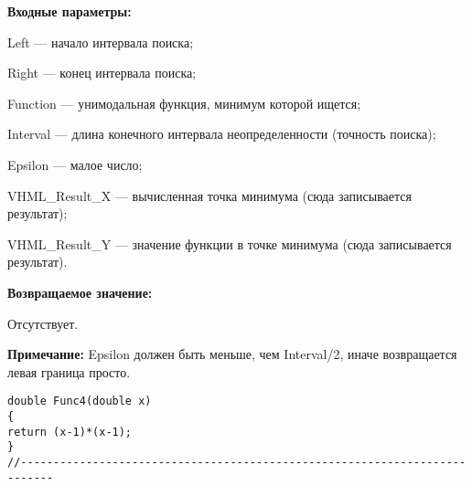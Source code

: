 \textbf{Входные параметры:}

 Left --- начало интервала поиска;
 
Right --- конец интервала поиска;
 
Function --- унимодальная функция, минимум которой ищется;
 
Interval --- длина конечного интервала неопределенности (точность поиска);
 
Epsilon --- малое число;
 
VHML\_Result\_X --- вычисленная точка минимума (сюда записывается результат);
 
VHML\_Result\_Y --- значение функции в точке минимума (сюда записывается результат).

\textbf{Возвращаемое значение:}
 
 Отсутствует.
 
\textbf{Примечание:}
 Epsilon должен быть меньше, чем Interval/2, иначе возвращается левая граница просто.

\begin{lstlisting}[caption=Оптимизируемая функция]
double Func4(double x)
{
return (x-1)*(x-1);
}
//---------------------------------------------------------------------------
\end{lstlisting}